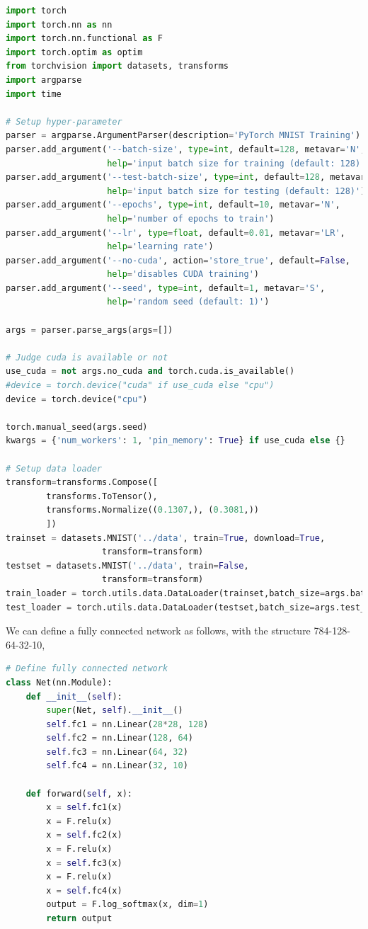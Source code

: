\begin{lstlisting}[language=Python]
import torch
import torch.nn as nn
import torch.nn.functional as F
import torch.optim as optim
from torchvision import datasets, transforms
import argparse
import time

# Setup hyper-parameter
parser = argparse.ArgumentParser(description='PyTorch MNIST Training')
parser.add_argument('--batch-size', type=int, default=128, metavar='N',
                    help='input batch size for training (default: 128)')
parser.add_argument('--test-batch-size', type=int, default=128, metavar='N',
                    help='input batch size for testing (default: 128)')
parser.add_argument('--epochs', type=int, default=10, metavar='N',
                    help='number of epochs to train')
parser.add_argument('--lr', type=float, default=0.01, metavar='LR',
                    help='learning rate')
parser.add_argument('--no-cuda', action='store_true', default=False,
                    help='disables CUDA training')
parser.add_argument('--seed', type=int, default=1, metavar='S',
                    help='random seed (default: 1)')

args = parser.parse_args(args=[]) 

# Judge cuda is available or not
use_cuda = not args.no_cuda and torch.cuda.is_available()
#device = torch.device("cuda" if use_cuda else "cpu")
device = torch.device("cpu")

torch.manual_seed(args.seed)
kwargs = {'num_workers': 1, 'pin_memory': True} if use_cuda else {}

# Setup data loader
transform=transforms.Compose([
        transforms.ToTensor(),
        transforms.Normalize((0.1307,), (0.3081,))
        ])
trainset = datasets.MNIST('../data', train=True, download=True,
                   transform=transform)
testset = datasets.MNIST('../data', train=False,
                   transform=transform)
train_loader = torch.utils.data.DataLoader(trainset,batch_size=args.batch_size, shuffle=True,**kwargs)
test_loader = torch.utils.data.DataLoader(testset,batch_size=args.test_batch_size, shuffle=False, **kwargs)
\end{lstlisting}

We can define a fully connected network as follows, with the structure 784-128-64-32-10,

\begin{lstlisting}[language=Python]
# Define fully connected network
class Net(nn.Module):
    def __init__(self):
        super(Net, self).__init__()
        self.fc1 = nn.Linear(28*28, 128)
        self.fc2 = nn.Linear(128, 64)
        self.fc3 = nn.Linear(64, 32)
        self.fc4 = nn.Linear(32, 10)

    def forward(self, x):
        x = self.fc1(x)
        x = F.relu(x)
        x = self.fc2(x)
        x = F.relu(x)
        x = self.fc3(x)
        x = F.relu(x)
        x = self.fc4(x)
        output = F.log_softmax(x, dim=1)
        return output
\end{lstlisting}

